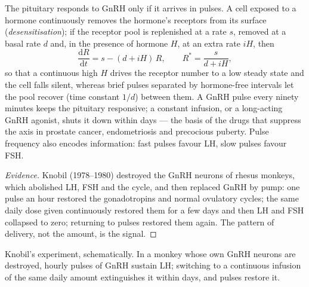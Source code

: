 \begin{proposition}\label{prop:b2:reproductive-hormones:pulses}
The pituitary responds to GnRH only if it arrives in pulses. A cell
exposed to a hormone continuously removes the hormone's receptors
from its surface (\emph{desensitisation}); if the receptor pool is
replenished at a rate $s$, removed at a basal rate $d$ and, in the
presence of hormone $H$, at an extra rate $iH$, then
\[
\frac{\mathrm{d}R}{\mathrm{d}t} = s - (d + iH)\,R, \qquad R^* = \frac{s}{d + iH},
\]
so that a continuous high $H$ drives the receptor number to a low
steady state and the cell falls silent, whereas brief pulses
separated by hormone-free intervals let the pool recover
(time constant $1/d$) between them. A GnRH pulse every ninety
minutes keeps the pituitary responsive; a constant infusion, or a
long-acting GnRH agonist, shuts it down within days --- the basis
of the drugs that suppress the axis in prostate cancer, endometriosis
and precocious puberty. Pulse frequency also encodes information:
fast pulses favour LH, slow pulses favour FSH.
\end{proposition}
\begin{proof}[Evidence]
Knobil (1978--1980) destroyed the GnRH neurons of rhesus monkeys,
which abolished LH, FSH and the cycle, and then replaced GnRH by
pump: one pulse an hour restored the gonadotropins and normal
ovulatory cycles; the same daily dose given continuously restored
them for a few days and then LH and FSH collapsed to zero; returning
to pulses restored them again. The pattern of delivery, not the
amount, is the signal.
\end{proof}

\begin{omfigure}

{\small Knobil's experiment, schematically. In a monkey whose own
GnRH neurons are destroyed, hourly pulses of GnRH sustain LH;
switching to a continuous infusion of the same daily amount
extinguishes it within days, and pulses restore it.}
\end{omfigure}


